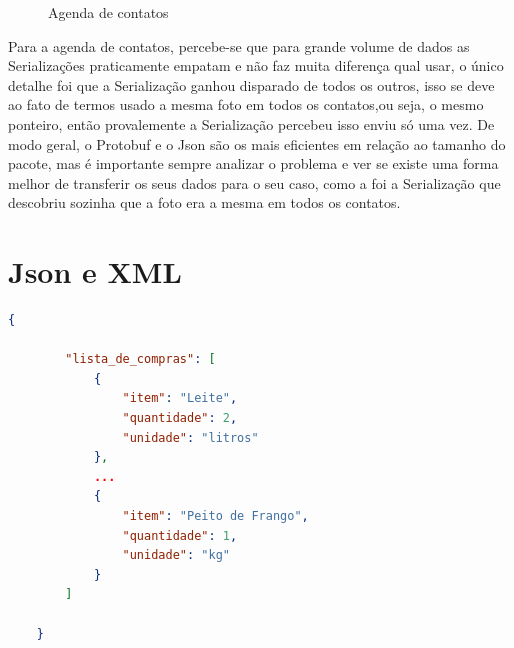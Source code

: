 \documentclass{article}
\begin{document}
\begin{figure}[H]
    \centering
    \caption{Agenda de contatos}
\end{figure}
Para a agenda de contatos, percebe-se que para grande volume de dados as Serializações praticamente empatam e não faz muita diferença qual usar, o único detalhe foi que a Serialização ganhou disparado de todos os outros, isso se deve ao fato de termos usado a mesma foto em todos os contatos,ou seja, o mesmo ponteiro, então provalemente a Serialização percebeu isso enviu só uma vez.
De modo geral, o Protobuf e o Json são os mais eficientes em relação ao tamanho do pacote, mas é importante sempre analizar o problema e ver se existe uma forma melhor de transferir os seus dados para o seu caso, como a foi a Serialização que descobriu sozinha que a foto era a mesma em todos os contatos.

\appendix
\section{Json e XML}

\begin{lstlisting}[language=json, caption=Lista de compras Json.]
    {
        
        "lista_de_compras": [
            {
                "item": "Leite",
                "quantidade": 2,
                "unidade": "litros"
            },
            ...
            {
                "item": "Peito de Frango",
                "quantidade": 1,
                "unidade": "kg"
            }
        ]
    
    }
    \end{lstlisting}
    
\end{document}
